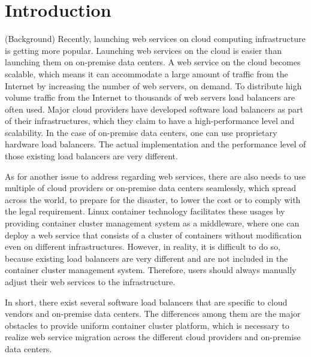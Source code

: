 \section{Introduction}

(Background)
Recently, launching web services on cloud computing infrastructure is getting more popular.
Launching web services on the cloud is easier than launching them on on-premise data centers.
A web service on the cloud becomes scalable, which means it can accommodate a large amount of traffic from the Internet by increasing the number of web servers, on demand.
To distribute high volume traffic from the Internet to thousands of web servers load balancers are often used.
Major cloud providers have developed software load balancers\cite{eisenbud2016maglev,patel2013ananta} as part of their infrastructures, which they claim to have a high-performance level and scalability.
In the case of on-premise data centers, one can use proprietary hardware load balancers.
The actual implementation and the performance level of those existing load balancers are very different.

As for another issue to address regarding web services,
there are also needs to use multiple of cloud providers or on-premise data centers seamlessly, which spread across the world, to prepare for the disaster, to lower the cost or to comply with the legal requirement.
Linux container technology\cite{menage2007adding} facilitates these usages by providing container cluster management system as a middleware,
where one can deploy a web service that consists of a cluster of containers without modification even on different infrastructures.
However, in reality, it is difficult to do so, because existing load balancers are very different and are not included in the container cluster management system.
Therefore, users should always manually adjust their web services to the infrastructure.

In short, there exist several software load balancers that are specific to cloud vendors and on-premise data centers.
The differences among them are the major obstacles to provide uniform container cluster platform, which is necessary to realize web service migration across the different cloud providers and on-premise data centers.

